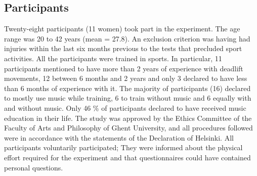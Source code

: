 \documentclass[10pt,letterpaper]{article}
\begin{document}
\subsection*{Participants}
Twenty-eight participants (11 women) took part in the experiment. The age range was 20 to 42 years (mean = 27.8). An exclusion criterion was having had injuries within the last six months previous to the tests that precluded sport activities. 
All the participants were trained in sports. In particular, 11 participants mentioned to have more than 2 years of experience with deadlift movements, 12 between 6 months and 2 years and only 3 declared to have less than 6 months of experience with it.   
The majority of participants (16) declared to mostly use music while training, 6 to train without music and 6 equally  with and without music.
Only 46 \% of participants declared to have received music education in their life.
The study was approved by the Ethics Committee of the Faculty of Arts and Philosophy of Ghent University, and all procedures followed were in accordance with the statements of the Declaration of Helsinki. All participants voluntarily participated; They were informed about the physical effort required for the experiment and that questionnaires could have contained personal questions.
\end{document}
